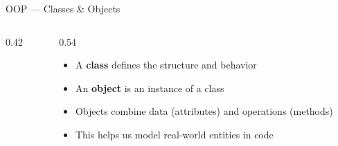 \begin{frame}{OOP — Classes \& Objects}
\begin{columns}[T]
\begin{column}{0.42\textwidth}
\begin{center}

            \end{center}

        \end{column}



        \begin{column}{0.54\textwidth}

            \vspace{0.15cm}

            \begin{itemize}

                \item
                A \textcolor{WorkshopBlue}{\textbf{class}}
                defines the structure and behavior

                \vspace{0.22cm}

                \item
                An \textcolor{WorkshopBlue}{\textbf{object}}
                is an instance of a class

                \vspace{0.22cm}

                \item
                Objects combine data (attributes) and
                operations (methods)

                \vspace{0.22cm}

                \item
                This helps us model real-world entities
                in code


\end{itemize}
\end{column}
\end{columns}
\end{frame}
